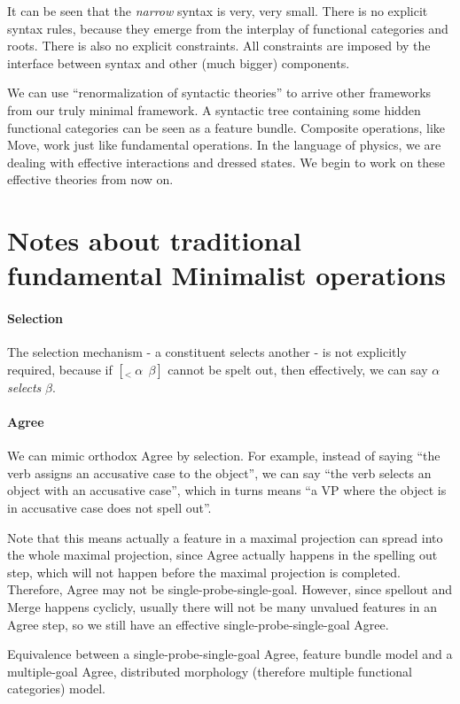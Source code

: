 \documentclass[a4paper]{article}
\begin{document}
It can be seen that the \emph{narrow} syntax is very, very small. There is no explicit syntax rules, because they
emerge from the interplay of functional categories and roots. There is also no explicit constraints.
All constraints are imposed by the interface between syntax and other (much bigger) components.

We can use ``renormalization of syntactic theories'' to arrive other frameworks from our truly minimal framework.
A syntactic tree containing some hidden functional categories can be seen as a feature bundle.
Composite operations, like Move, work just like fundamental operations. 
In the language of physics, we are dealing with effective interactions and dressed states. 
We begin to work on these effective theories from now on.

\section{Notes about traditional fundamental Minimalist operations}

\paragraph{Selection} The selection mechanism - a constituent selects another - is not explicitly required,
because if $[_< \ \alpha \ \ \beta]$ cannot be spelt out, then effectively, we can say $\alpha$ \emph{selects}
$\beta$. 

\paragraph{Agree} We can mimic orthodox Agree by selection. For example, instead of saying ``the verb assigns 
an accusative case to the object'', we can say ``the verb selects an object with an accusative case'', which 
in turns means ``a VP where the object is in accusative case does not spell out''.

Note that this means actually a feature in a maximal projection can spread into the whole maximal projection, 
since Agree actually happens in the spelling out step, which will not happen before the maximal projection is 
completed. Therefore, Agree may not be single-probe-single-goal. However, since spellout and Merge happens 
cyclicly, usually there will not be many unvalued features in an Agree step, so we still have an 
effective single-probe-single-goal Agree.

\begin{exe}
    \ex Equivalence between a single-probe-single-goal Agree, feature bundle model and a multiple-goal Agree, distributed morphology (therefore multiple functional categories) model. %
\end{exe}
\end{document}

